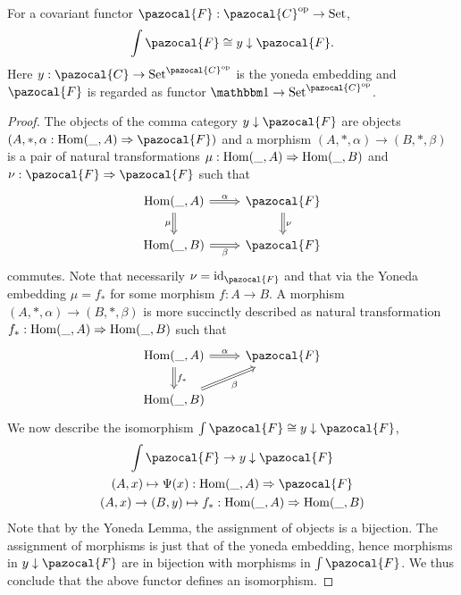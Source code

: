 \begin{lemma}
    For a covariant functor $\pazocal{F}:\pazocal{C}\op \rightarrow \mathrm{Set}$, 
    $$\int\pazocal{F} \cong y \downarrow \pazocal{F}.$$
    Here $y: \pazocal{C}\rightarrow \mathrm{Set}^{\pazocal{C}\op}$ is the yoneda embedding and $\pazocal{F}$ is regarded as functor $\fone\rightarrow \mathrm{Set}^{\pazocal{C}\op}$.
\end{lemma}
\begin{proof}
    The objects of the comma category $y\downarrow \pazocal{F}$ are objects $(A,\ast, \alpha : \Hom(\_,A) \Rightarrow \pazocal{F})$ and a morphism $(A,\ast,\alpha)\rightarrow (B,\ast,\beta)$ is a pair of natural transformations $\mu: \mathrm{Hom}(\_,A) \Rightarrow \mathrm{Hom}(\_,B)$ and $\nu: \pazocal{F} \Rightarrow \pazocal{F}$ such that
    $$
        \begin{tikzcd}
            \Hom(\_,A) \arrow[d, Rightarrow, "\mu", swap] \arrow[r,Rightarrow, "\alpha"] & \pazocal{F} \arrow[d,Rightarrow, "\nu"] \\
            \Hom(\_,B) \arrow[r, Rightarrow, "\beta", swap] & \pazocal{F}
        \end{tikzcd}
    $$
    commutes. Note that necessarily $\nu = \id_\pazocal{F}$ and that via the Yoneda embedding $\mu = f_\ast$ for some morphism $ f: A\rightarrow B$. A morphism $(A,\ast,\alpha)\rightarrow (B,\ast,\beta)$ is more succinctly described as natural transformation $f_\ast : \mathrm{Hom}(\_,A)\Rightarrow \mathrm{Hom}(\_,B)$ such that 
    $$
        \begin{tikzcd}
            \Hom(\_,A) \arrow[Rightarrow, r, "\alpha"] \arrow[Rightarrow, d, "f_\ast"] &\pazocal{F}\\
            \Hom(\_,B) \arrow[Rightarrow, ur, "\beta", swap] 
        \end{tikzcd}
    $$
    We now describe the isomorphism $\int \pazocal{F}\cong y\downarrow \pazocal{F}$, 
    \begin{gather*}
        \int \pazocal{F} \rightarrow y\downarrow \pazocal{F}\\
        (A,x) \mapsto \Psi(x) : \Hom(\_,A)\Rightarrow \pazocal{F}\\
        (A,x)\rightarrow (B,y) \mapsto f_\ast : \Hom(\_,A)\Rightarrow \Hom(\_,B)
    \end{gather*}
    Note that by the Yoneda Lemma, the assignment of objects is a bijection. The assignment of morphisms is just that of the yoneda embedding, hence morphisms in $y\downarrow \pazocal{F}$ are in bijection with morphisms in $\int \pazocal{F}$. We thus conclude that the above functor defines an isomorphism. 
\end{proof}
